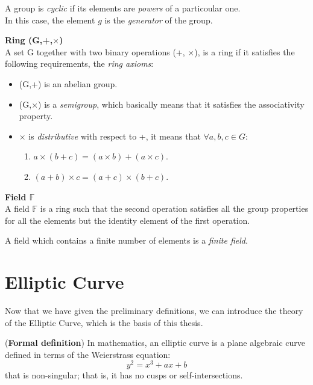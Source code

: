 A group is \textit{cyclic} if its elements are \textit{powers} of a particoular one.\\
In this case, the element $g$ is the \textit{generator} of the group.

\begin{teorema}{\textbf{Ring (G,+,$\times$)}}\\
	A set G together with two binary operations (+, $\times$), is a ring if it satisfies the following requirements, the \textit{ring axioms}:
	\begin{itemize}
		\item (G,+) is an abelian group.
		\item (G,$\times$) is a \textit{semigroup}, which basically means that it satisfies the associativity property.
		\item $\times$ is \textit{distributive} with respect to +, it means that $\forall a,b,c \in G$:
		\begin{enumerate}
			\item $a\times (b+c)=(a\times b)+(a\times c)$.
			\item $(a+b)\times c=(a+c)\times (b+c)$.
		\end{enumerate}
	\end{itemize}
\end{teorema}

\begin{teorema}{\textbf{Field $\mathbb{F}$}}\\
	A field $\mathbb{F}$ is a ring such that the second operation satisfies all the group properties for all the elements but the identity element of the first operation.
\end{teorema}

A field which contains a finite number of elements is a \textit{finite field}.




\section{Elliptic Curve}
Now that we have given the preliminary definitions, we can introduce the theory of the Elliptic Curve, which is the basis of this thesis.
\begin{teorema}{(\textbf{Formal definition})}
	In mathematics, an elliptic curve is a plane algebraic curve defined in terms of the Weierstrass equation:
	\begin{equation}
	\label{eqn:EC}
	 y^{2}=x^{3}+ax+b
	\end{equation}
	that is non-singular; that is, it has no cusps or self-intersections.
\end{teorema}


